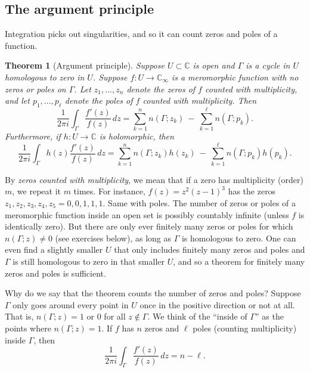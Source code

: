 \documentclass[12pt,openany]{book}
\newcommand{\C}{{\mathbb{C}}}
\newcommand{\myindex}[1]{#1\index{#1}}
\newcommand{\myquote}[1]{``#1''}
\theoremstyle{plain}
\newtheorem{thm}{Theorem}[section]
\theoremstyle{remark}
\theoremstyle{definition}
\theoremstyle{exercise}
\theoremstyle{example}
\begin{document}
\subsection{The argument principle}

Integration picks out singularities, and so it can count zeros and
poles of a function.

\begin{thm}[Argument principle]\label{thm:argprinc}
\pagebreak[2]
Suppose $U \subset \C$ is open and $\Gamma$ is a cycle in $U$
homologous to zero in $U$.
Suppose $f \colon U \to \C_\infty$ is a meromorphic function with no zeros
or poles on $\Gamma$.
Let 
$z_1,\ldots,z_n$ denote the 
zeros of $f$ counted with multiplicity,
and let $p_1,\ldots,p_\ell$ denote the poles of $f$ counted with multiplicity.
Then
\begin{equation*}
\frac{1}{2\pi i}
\int_\Gamma \frac{f'(z)}{f(z)} \, dz
=
\sum_{k=1}^n n(\Gamma;z_k)
~
-
~
\sum_{k=1}^\ell n(\Gamma;p_k) .
\end{equation*}
Furthermore, if $h \colon U \to \C$ is holomorphic, then
\begin{equation*}
\frac{1}{2\pi i}
\int_\Gamma h(z) \frac{f'(z)}{f(z)} \, dz
=
\sum_{k=1}^n n(\Gamma;z_k)h(z_k) 
~
-
~
\sum_{k=1}^\ell n(\Gamma;p_k)h(p_k) .
\end{equation*}
\end{thm}

By
\emph{\myindex{zeros counted with multiplicity}},
we mean that if
a zero has multiplicity (order) $m$, we repeat it $m$ times.
For instance, $f(z) = z^2{(z-1)}^3$ has the zeros $z_1,z_2,z_3,z_4,z_5 = 0,0,1,1,1$.
Same with poles.
The number of zeros or poles of a meromorphic function
inside an open set is possibly countably
infinite (unless $f$ is identically zero).
But there are only ever finitely
many zeros or poles for which 
$n(\Gamma;z) \neq 0$ (see exercises below), as long as $\Gamma$ is
homologous to zero.  One can even find a slightly smaller $U$ that only
includes finitely many zeros and poles and $\Gamma$ is still homologous to
zero in that smaller $U$, and so a theorem for finitely many zeros and poles is
sufficient.

Why do we say that the theorem counts the number of zeros and poles?
Suppose $\Gamma$ only goes around every point in $U$ once
in the positive direction or not at all.  That is,
$n(\Gamma;z) = 1$ or $0$ for all $z \notin \Gamma$.
We think of the
\myquote{inside of $\Gamma$} as the points where $n(\Gamma;z)=1$.
If $f$ has $n$ zeros and $\ell$ poles (counting multiplicity)
inside $\Gamma$, then
\begin{equation*}
\frac{1}{2\pi i}
\int_\Gamma \frac{f'(z)}{f(z)} \, dz
= n - \ell .
\end{equation*}
\end{document}
